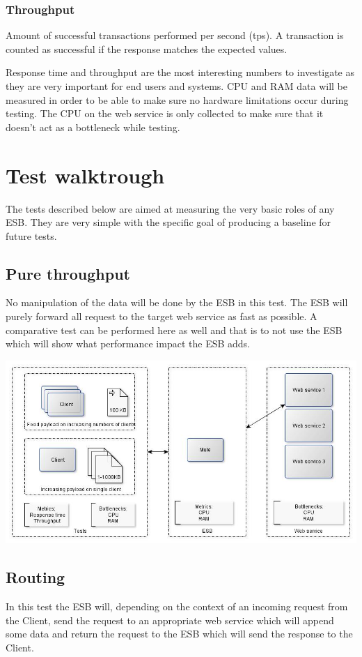 \subsubsection{Throughput}
Amount of successful transactions performed per second (tps). A transaction is counted as successful if the response matches the expected values.


Response time and throughput are the most interesting numbers to investigate as they are very important for end users and systems. 
CPU and RAM data will be measured in order to be able to make sure no hardware limitations occur during testing. The CPU on the web service is only collected to make sure that it doesn't act as a bottleneck while testing. 

\section{Test walktrough}
The tests described below are aimed at measuring the very basic roles of any ESB. They are very simple with the specific goal of producing a baseline for future tests.

\subsection{Pure throughput}
No manipulation of the data will be done by the ESB in this test. The ESB will purely forward all request to the target web service as fast as possible.
A comparative test can be performed here as well and that is to not use the ESB which will show what performance impact the ESB adds. 

\centerline{\includegraphics[scale=0.43]{img/direct_proxy}}

\subsection{Routing}
In this test the ESB will, depending on the context of an incoming request from the Client, send the request to an appropriate web service which will append some data and return the request to the ESB which will send the response to the Client.

